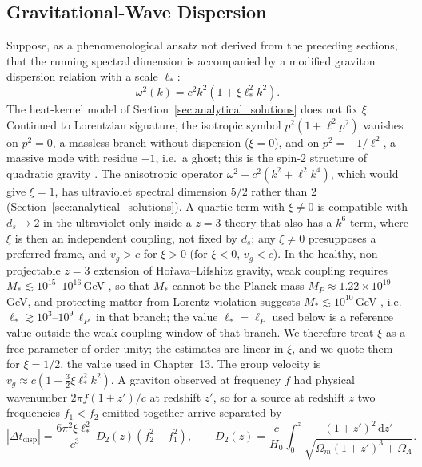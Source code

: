 \documentclass[11pt,a4paper,reqno]{amsart}
\theoremstyle{definition}
\numberwithin{equation}{section}
\newcommand{\dif}{\,\mathrm{d}}
\begin{document}
\subsection{Gravitational-Wave Dispersion}
Suppose, as a phenomenological ansatz not derived from the preceding sections, that the running spectral dimension is accompanied by a modified graviton dispersion relation with a scale $\ell_\ast$:
\begin{equation}
    \label{eq:graviton_dispersion}
    \omega^2(k) = c^2 k^2 \left( 1 + \xi \ell_\ast^2 k^2 \right).
\end{equation}
The heat-kernel model of Section~\ref{sec:analytical_solutions} does not fix $\xi$. Continued to Lorentzian signature, the isotropic symbol $p^2(1 + \ell^2 p^2)$ vanishes on $p^2 = 0$, a massless branch without dispersion ($\xi = 0$), and on $p^2 = -1/\ell^2$, a massive mode with residue $-1$, i.e.\ a ghost; this is the spin-2 structure of quadratic gravity \cite{Stelle1977}. The anisotropic operator $\omega^2 + c^2(k^2 + \ell^2 k^4)$, which would give $\xi = 1$, has ultraviolet spectral dimension $5/2$ rather than $2$ (Section~\ref{sec:analytical_solutions}). A quartic term with $\xi \neq 0$ is compatible with $d_s \to 2$ in the ultraviolet only inside a $z = 3$ theory that also has a $k^6$ term, where $\xi$ is then an independent coupling, not fixed by $d_s$; any $\xi \neq 0$ presupposes a preferred frame, and $v_g > c$ for $\xi > 0$ (for $\xi < 0$, $v_g < c$). In the healthy, non-projectable $z = 3$ extension of Ho\v{r}ava--Lifshitz gravity, weak coupling requires $M_\ast \lesssim 10^{15}$--$10^{16}$\,GeV \cite{blas2011models}, so that $M_\ast$ cannot be the Planck mass $M_P \approx 1.22\times10^{19}$\,GeV, and protecting matter from Lorentz violation suggests $M_\ast \lesssim 10^{10}$\,GeV \cite{pospelov2012lorentz}, i.e.\ $\ell_\ast \gtrsim 10^{3}$--$10^{9}\,\ell_P$ in that branch; the value $\ell_\ast = \ell_P$ used below is a reference value outside the weak-coupling window of that branch. We therefore treat $\xi$ as a free parameter of order unity; the estimates are linear in $\xi$, and we quote them for $\xi = 1/2$, the value used in Chapter~13. The group velocity is $v_g \approx c(1 + \frac{3}{2}\xi \ell_\ast^2 k^2)$. A graviton observed at frequency $f$ had physical wavenumber $2\pi f(1+z')/c$ at redshift $z'$, so for a source at redshift $z$ two frequencies $f_1 < f_2$ emitted together arrive separated by \cite{jacob2008lorentz, mirshekari2012constraining}
\begin{equation}
    |\Delta t_{\mathrm{disp}}| = \frac{6 \pi^2 \xi \ell_\ast^2}{c^3}\, D_2(z) \left( f_2^2 - f_1^2 \right), \qquad D_2(z) = \frac{c}{H_0} \int_0^z \frac{(1+z')^2 \dif z'}{\sqrt{\Omega_m(1+z')^3 + \Omega_\Lambda}}.
\end{equation}
\end{document}
